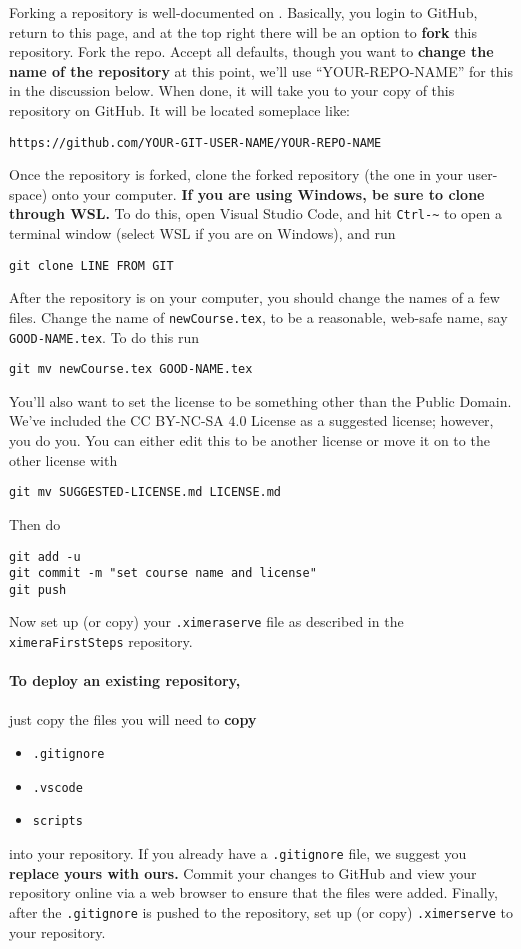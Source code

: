 \documentclass{ximera}
\begin{document}
Forking a repository is well-documented on
.
Basically, you login to GitHub, return to this page, and at the top right there
will be an option to \textbf{fork} this repository. Fork the repo. Accept all
defaults, though you want to \textbf{change the name of the repository} at this
point, we'll use ``YOUR-REPO-NAME'' for this in the discussion below. When done, it will take you to
your copy of this repository on GitHub. It will be located someplace like:
\begin{center}
  \texttt{https://github.com/YOUR-GIT-USER-NAME/YOUR-REPO-NAME}
\end{center}
Once the repository is forked, clone the forked repository (the one in your
user-space) onto your computer. \textbf{If you are using Windows, be sure to
  clone through WSL.} To do this, open Visual Studio Code, and hit \verb!Ctrl-~! to open a terminal window (select WSL if you are on Windows), and run
\begin{verbatim}
git clone LINE FROM GIT
\end{verbatim}
After the repository is on your computer, you should change the names of a few files. Change the name of \verb!newCourse.tex!, to be a reasonable, web-safe name, say \verb!GOOD-NAME.tex!. 
To do this run
\begin{verbatim}
git mv newCourse.tex GOOD-NAME.tex
\end{verbatim}
You'll also want to set the license to be something other than the Public Domain. We've included the CC BY-NC-SA 4.0
License as a suggested license; however, you do you. You can either edit this to be another license or move it on to the other license with
\begin{verbatim}
git mv SUGGESTED-LICENSE.md LICENSE.md
\end{verbatim}
Then do
\begin{verbatim}
git add -u 
git commit -m "set course name and license"
git push
\end{verbatim}
Now set up (or copy) your \verb!.ximeraserve! file as described in the \verb!ximeraFirstSteps! repository. 




\paragraph{To deploy an existing repository,} just copy the files
you will need to \textbf{copy}
\begin{itemize}
  \item \texttt{.gitignore}
  \item \texttt{.vscode}
  \item \texttt{scripts}
\end{itemize}
into your repository. If you already have a \verb|.gitignore| file, we suggest
you \textbf{replace yours with ours.} Commit your changes to GitHub and view your
repository online via a web browser to ensure that the files were added.
Finally, after the \verb!.gitignore! is pushed to the repository, set up (or copy) 
\verb!.ximerserve! to your repository.
\end{document}
